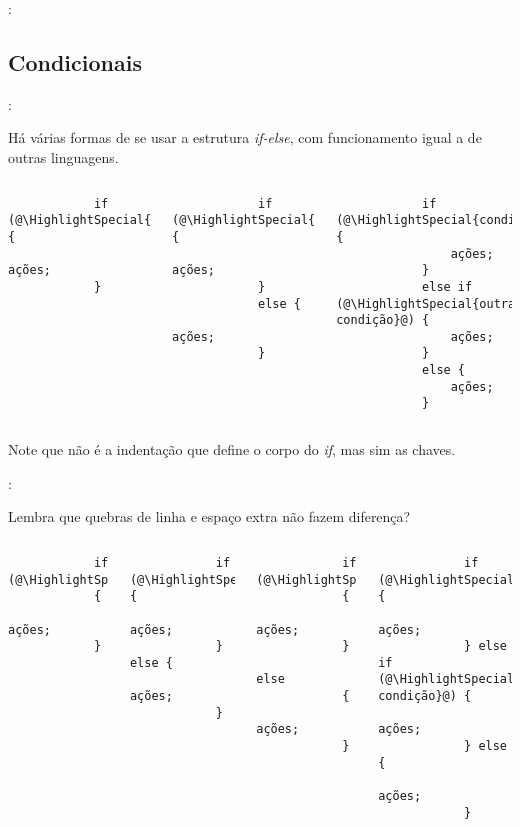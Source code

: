 \begin{frame}{\insertsection: \insertsubsection}
\end{frame}


\subsection{Condicionais}


\begin{frame}[fragile]{\insertsection: \insertsubsection}

	Há várias formas de se usar a estrutura \textit{if-else}, com funcionamento igual a de outras linguagens.
	\begin{columns}[t]
		\begin{verbatim}
			if (@\HighlightSpecial{condição}@) {
				ações;
			}
		\end{verbatim}

		\begin{verbatim}
			if (@\HighlightSpecial{condição}@) {
				ações;
			}
			else {
				ações;
			}
		\end{verbatim}

		\begin{verbatim}
			if (@\HighlightSpecial{condição}@) {
				ações;
			}
			else if (@\HighlightSpecial{outra condição}@) {
				ações;
			}
			else {
				ações;
			}
		\end{verbatim}
	\end{columns}
	Note que não é a indentação que define o corpo do \textit{if}, mas sim as chaves.

\end{frame}


\begin{frame}[fragile]{\insertsection: \insertsubsection}

	Lembra que quebras de linha e espaço extra não fazem diferença?
	\begin{columns}[t]
		\begin{verbatim}
			if (@\HighlightSpecial{condição}@)
			{
				ações;
			}
		\end{verbatim}

		\vspace{-\medskipamount}
		\begin{verbatim}
			if (@\HighlightSpecial{condição}@) {
				ações;
			} else {
				ações;
			}
		\end{verbatim}

		\begin{verbatim}
			if (@\HighlightSpecial{condição}@)
			{
				ações;
			}
			else
			{
				ações;
			}
		\end{verbatim}

		\begin{verbatim}
			if (@\HighlightSpecial{condição}@) {
				ações;
			} else if (@\HighlightSpecial{outra condição}@) {
				ações;
			} else {
				ações;
			}
		\end{verbatim}
	\end{columns}

\end{frame}



